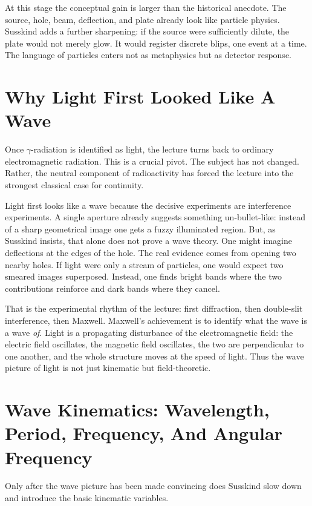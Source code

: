 At this stage the conceptual gain is larger than the historical anecdote. The source, hole, beam, deflection, and plate already look like particle physics. Susskind adds a further sharpening: if the source were sufficiently dilute, the plate would not merely glow. It would register discrete blips, one event at a time. The language of particles enters not as metaphysics but as detector response.

\section{Why Light First Looked Like A Wave}

Once \(\gamma\)-radiation is identified as light, the lecture turns back to ordinary electromagnetic radiation. This is a crucial pivot. The subject has not changed. Rather, the neutral component of radioactivity has forced the lecture into the strongest classical case for continuity.

Light first looks like a wave because the decisive experiments are interference experiments. A single aperture already suggests something un-bullet-like: instead of a sharp geometrical image one gets a fuzzy illuminated region. But, as Susskind insists, that alone does not prove a wave theory. One might imagine deflections at the edges of the hole. The real evidence comes from opening two nearby holes. If light were only a stream of particles, one would expect two smeared images superposed. Instead, one finds bright bands where the two contributions reinforce and dark bands where they cancel.

That is the experimental rhythm of the lecture: first diffraction, then double-slit interference, then Maxwell. Maxwell's achievement is to identify what the wave is a wave \emph{of}. Light is a propagating disturbance of the electromagnetic field: the electric field oscillates, the magnetic field oscillates, the two are perpendicular to one another, and the whole structure moves at the speed of light. Thus the wave picture of light is not just kinematic but field-theoretic.

\section{Wave Kinematics: Wavelength, Period, Frequency, And Angular Frequency}

Only after the wave picture has been made convincing does Susskind slow down and introduce the basic kinematic variables.

